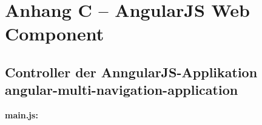 \chapter*{Anhang C -- AngularJS Web Component}\label{anhang-c---angularjs-web-component}

\section*{Controller der AnngularJS-Applikation angular-multi-navigation-application}\label{controller-der-angular-multi-navigation-application}

\textbf{main.js:}

\begin{Shaded}
\begin{Highlighting}[]
\OperatorTok{;}


\end{Highlighting}
\end{Shaded}
